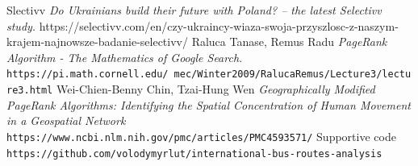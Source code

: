\begin{thebibliography}{9} 
	Slectivv \textit{Do Ukrainians build their future with Poland? – the latest Selectivv study.}
	https://selectivv.com/en/czy-ukraincy-wiaza-swoja-przyszlosc-z-naszym-krajem-najnowsze-badanie-selectivv/
	Raluca Tanase, Remus Radu \textit{PageRank Algorithm - The Mathematics of Google Search.} 
	\newline
	\texttt{https://pi.math.cornell.edu/~mec/Winter2009/RalucaRemus/Lecture3/lecture3.html}
	Wei-Chien-Benny Chin, Tzai-Hung Wen \textit{Geographically Modified PageRank Algorithms: Identifying the Spatial Concentration of Human Movement in a Geospatial Network}
	\newline
	\\\texttt{https://www.ncbi.nlm.nih.gov/pmc/articles/PMC4593571/}
	Supportive code
	\\\texttt{https://github.com/volodymyrlut/international-bus-routes-analysis}
\end{thebibliography}


